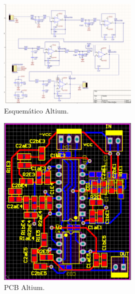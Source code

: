  \begin{figure}[H]
	\centering
	\includegraphics[width=0.6\textwidth]{ImagenesEjercicio2/altiumesq.PNG}
\caption{Esquemático Altium.}
	\label{fig:altiumesq}
\end{figure}
 \begin{figure}[H]
	\centering
	\includegraphics[width=0.6\textwidth]{ImagenesEjercicio2/altiumpcb.PNG}
\caption{PCB Altium.}
	\label{fig:altiumpcb}
\end{figure}